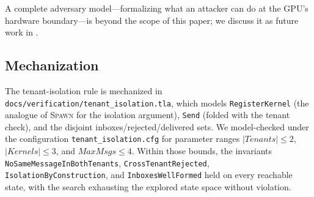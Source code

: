 A complete adversary model—formalizing what an attacker can do at
the GPU's hardware boundary—is beyond the scope of this paper; we
discuss it as future work in .

\subsection{Mechanization}
\label{sec:tenancy:mechanization}

The tenant-isolation rule is mechanized in
\texttt{docs/verification/tenant\_isolation.tla}, which models
\texttt{RegisterKernel} (the analogue of \textsc{Spawn} for the
isolation argument), \texttt{Send} (folded with the tenant check),
and the disjoint inboxes/rejected/delivered sets.  We model-checked
under the configuration \texttt{tenant\_isolation.cfg} for parameter
ranges \(|\textit{Tenants}| \le 2\), \(|\textit{Kernels}| \le 3\),
and \(\textit{MaxMsgs} \le 4\).  Within those bounds, the
invariants \texttt{NoSameMessageInBothTenants},
\texttt{CrossTenantRejected}, \texttt{IsolationByConstruction}, and
\texttt{InboxesWellFormed} held on every reachable state, with the
search exhausting the explored state space without violation.
